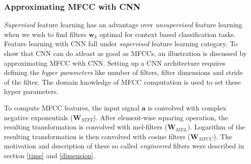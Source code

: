 \subsubsection{Approximating MFCC with CNN}
\textit{Supervised} feature learning has an advantage over \textit{unsupervised} feature learning when we wish to find filters $\textbf{w}_{k}$ optimal for context based classification tasks. Feature learning with CNN fall under \textit{supervised} feature learning category.
To show that CNN can do atleast as good as MFCCs, an illustration is discussed by approximating MFCC with CNN. Setting up a CNN architecture requires defining the \textit{hyper parameters} like number of filters, filter dimensions and stride of the filter. The domain knowledge of MFCC computation is used to set these hyper parameters.
\bigskip  

\noindent To compute MFCC features, the input signal $\textbf{a}$ is convolved with complex negative exponentials ($\textbf{W}_{STFT}$). After element-wise squaring operation, the resulting transformation is convolved with mel-filters ($\textbf{W}_{MEL}$). Logarithm of the resulting transformation is then convolved with cosine filters ($\textbf{W}_{MFCC}$). The motivation and description of these so called \textit{engineered} filters were described in section \ref{time} and \ref{dimension}. 

